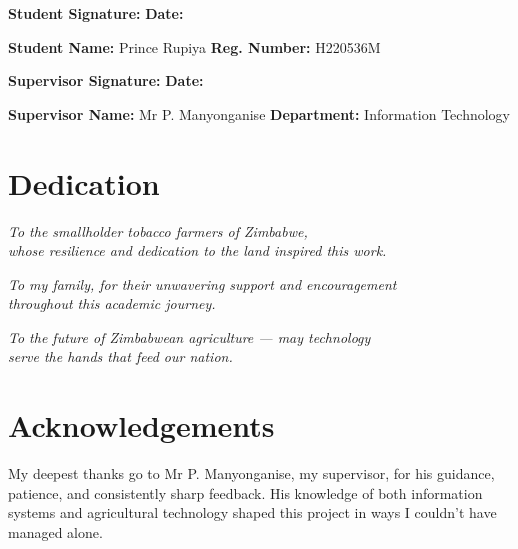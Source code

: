 \documentclass[12pt,a4paper]{report}
\begin{document}
\vspace{2cm}
\noindent\textbf{Student Signature:} \hrulefill \hspace{3cm} \textbf{Date:} \hrulefill

\vspace{1cm}
\noindent\textbf{Student Name:} Prince Rupiya \hspace{1cm} \textbf{Reg. Number:} H220536M

\vspace{2cm}
\noindent\textbf{Supervisor Signature:} \hrulefill \hspace{2.5cm} \textbf{Date:} \hrulefill

\vspace{1cm}
\noindent\textbf{Supervisor Name:} Mr P. Manyonganise \hspace{0.5cm} \textbf{Department:} Information Technology

\chapter*{Dedication}

\begin{center}
\textit{To the smallholder tobacco farmers of Zimbabwe,\\
whose resilience and dedication to the land inspired this work.}

\vspace{1cm}
\textit{To my family, for their unwavering support and encouragement\\
throughout this academic journey.}

\vspace{1cm}
\textit{To the future of Zimbabwean agriculture — may technology\\
serve the hands that feed our nation.}
\end{center}

\chapter*{Acknowledgements}

My deepest thanks go to Mr P. Manyonganise, my supervisor, for his guidance, patience, and consistently sharp feedback. His knowledge of both information systems and agricultural technology shaped this project in ways I couldn't have managed alone.
\end{document}
